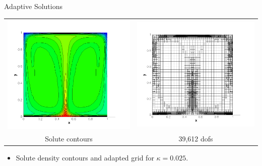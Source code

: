 \documentclass[compress,12pt]{beamer}
\begin{document}
\begin{frame}{Adaptive Solutions}
  {
    \begin{center}
      \begin{tabular}{cc} \\
	\includegraphics[width=.5\textwidth]{figures/s_adapt_kappa_0_025}&
	\includegraphics[width=.5\textwidth]{figures/grid_adapt_kappa_0_025}\\
	Solute contours &
	39,612 dofs
      \end{tabular}\end{center}
    \begin{itemize}
      
    \item Solute density contours and adapted grid for $\kappa=0.025$.
    \end{itemize}
  }


\end{frame}
\end{document}
